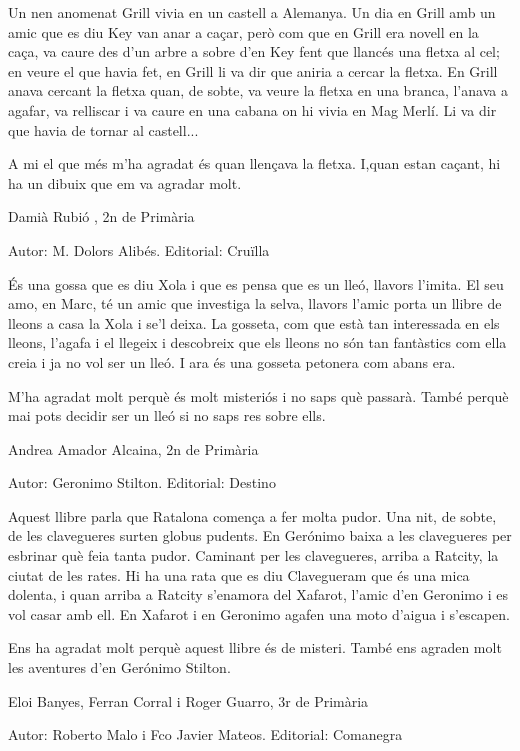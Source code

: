 \begin{shortnews}
{Un nen anomenat Grill vivia en un castell a Alemanya. Un dia en Grill amb un amic que es diu Key van anar a caçar, però com que en Grill era novell  en la caça, va caure des d’un arbre a sobre d’en Key fent que llancés una fletxa al cel; en veure el que havia fet, en Grill li va dir que aniria a cercar la fletxa. En Grill anava cercant la fletxa quan, de sobte, va veure la fletxa en una branca, l’anava a agafar,  va relliscar i va caure en una cabana on hi vivia en Mag Merlí.  Li va dir que havia de  tornar al castell...    

A mi el que més m’ha agradat és quan llençava la fletxa. I,quan estan caçant, hi ha un dibuix que em va agradar molt.

Damià Rubió ,  2n de Primària
}

{
Autor: M. Dolors Alibés.   Editorial: Cruïlla

És una gossa que es diu Xola i que es pensa que es un lleó, llavors l’imita. El seu amo,  en Marc, té un amic que investiga la selva, llavors l’amic porta un llibre de lleons a casa la Xola i se’l deixa. La gosseta, com que està tan interessada en els lleons, l’agafa i el llegeix i descobreix que els lleons no són tan fantàstics com ella creia i ja no vol ser un lleó. I ara és una gosseta petonera com abans era.

M’ha agradat molt perquè és molt misteriós i no saps què passarà. També perquè mai  pots decidir ser un lleó si no saps res sobre ells.

Andrea Amador Alcaina,  2n de Primària
}

{
Autor: Geronimo Stilton.   Editorial: Destino

Aquest llibre parla que Ratalona comença a fer molta pudor. Una nit, de sobte,  de les clavegueres surten globus pudents. En Gerónimo baixa a les clavegueres per esbrinar què feia tanta pudor. Caminant per les clavegueres, arriba a Ratcity, la ciutat de les rates. Hi ha una rata que es diu Clavegueram que és una mica dolenta, i quan arriba a Ratcity s’enamora del Xafarot, l’amic d’en Geronimo i es vol casar amb ell. En Xafarot i en Geronimo agafen una moto d’aigua i s’escapen.

Ens ha agradat molt perquè aquest llibre és de misteri. També ens agraden molt les aventures d’en Gerónimo Stilton.

Eloi Banyes, Ferran Corral i Roger Guarro, 3r de Primària
}


{
Autor: Roberto Malo i Fco Javier Mateos.  Editorial: Comanegra

}
\end{shortnews}
